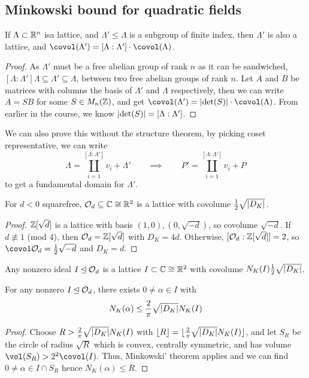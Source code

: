 \documentclass{article}
\begin{document}
\subsection{Minkowski bound for quadratic fields}

\begin{lemma}
    If $\Lambda\subset \mathbb{R}^n$ isa lattice, and $\Lambda'\leq \Lambda$ is a subgroup of finite index, then $\Lambda'$ is also a lattice, and $\covol(\Lambda')=[\Lambda:\Lambda']\cdot\covol(\Lambda)$.\begin{proof}
        As $\Lambda'$ must be a free abelian group of rank $n$ as it can be sandwiched, $[\Lambda:\Lambda']\Lambda \subseteq \Lambda'\subseteq \Lambda$, between two free abelian groups of rank $n$. Let $A$ and $B$ be matrices with columns the basis of $\Lambda'$ and $\Lambda$ respectively, then we can write $A=SB$ for some $S\in M_n(\mathbb{Z})$, and get $\covol(\Lambda')=\abs{\det(S)}\cdot\covol(\Lambda)$. From earlier in the course, we know $\left| \det(S) \right| = [\Lambda:\Lambda']$.
    \end{proof}
\end{lemma}

We can also prove this without the structure theorem, by picking coset representative, we can write \[
\Lambda = \coprod_{i=1}^{[\Lambda:\Lambda']}v_i + \Lambda' \qquad \implies \qquad P' = \coprod_{i=1}^{[\Lambda:\Lambda']} v_i + P
\] to get a fundamental domain for $\Lambda'$.

\begin{lemma}
    For $d<0$ squarefree, $\mathcal{O}_d\subseteq \mathbb{C} \cong \mathbb{R}^2$ is a lattice with covolume $\frac{1}{2}\sqrt{\left| D_K \right|}$.\begin{proof}
        $\mathbb{Z}[\sqrt{d}]$ is a lattice with basis $(1,0),(0,\sqrt{-d})$, so covolume $\sqrt{-d}$. If $d\not\equiv 1$ (mod 4), then $\mathcal{O}_d=\mathbb{Z}[\sqrt{d}]$ with $D_K=4d$. Otherwise, $[\mathcal{O}_d:\mathbb{Z}[\sqrt{d}]]=2$, so $\covol\cO_d = \frac{1}{2}\sqrt{-d}$ and $D_K=d$.
    \end{proof}
\end{lemma}

\begin{corollary}
    Any nonzero ideal $I\unlhd \mathcal{O}_d$ is a lattice $I\subset \mathbb{C} \cong \mathbb{R}^2$ with covolume $N_K(I)\frac{1}{2}\sqrt{\left| D_K \right|}$.
\end{corollary}

\begin{theorem}
    For any nonzero $I\unlhd \mathcal{O}_d$, there exists $0\neq\alpha \in I$ with \[
    N_K(\alpha) \leq \frac{2}{\pi}\sqrt{\left| D_K \right|}N_K(I)
    \]\begin{proof}
        Choose $R>\frac{2}{\pi}\sqrt{\left| D_K \right|}N_K(I)$ with $\lfloor R\rfloor = \lfloor\frac{2}{\pi}\sqrt{\left| D_K \right|}N_K(I)\rfloor$, and let $S_R$ be the circle of radius $\sqrt{R}$ which is convex, centrally symmetric, and has volume $\vol(S_R) > 2^2\covol(I)$. Thus, Minkowski' theorem applies and we can find $0\neq \alpha \in I\cap S_R$ hence $N_K(\alpha) \leq R$.
    \end{proof}
\end{theorem}
\end{document}
